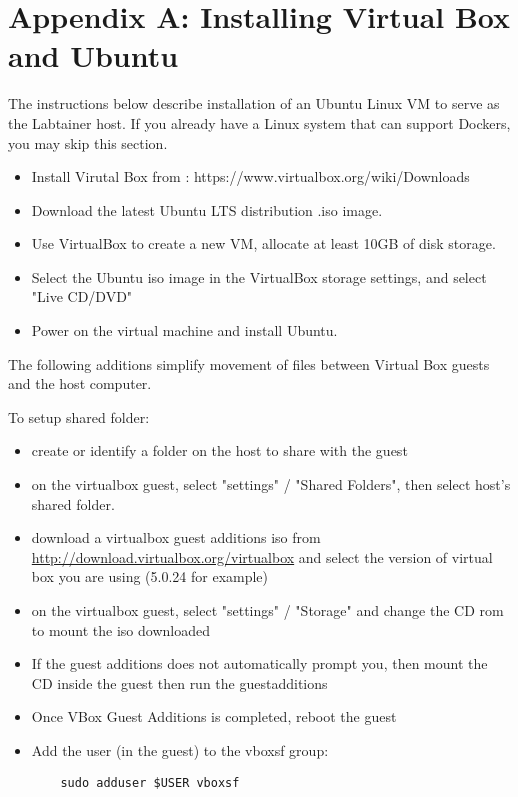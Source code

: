 \documentclass{article}
\begin{document}
\section {Appendix A: Installing Virtual Box and Ubuntu}
\label{sec:appendixA}
The instructions below describe installation of an Ubuntu Linux VM 
to serve as the Labtainer host.  If you already have a Linux system
that can support Dockers, you may skip this section.
\begin{itemize}
\item Install Virutal Box from : https://www.virtualbox.org/wiki/Downloads
\item Download the latest Ubuntu LTS distribution .iso image.
\item Use VirtualBox to create a new VM, allocate at least 10GB of disk storage.
\item Select the Ubuntu iso image in the VirtualBox storage settings, and select "Live CD/DVD"
\item Power on the virtual machine and install Ubuntu.
\end{itemize}

The following additions simplify movement of files between Virtual Box guests
and the host computer.

To setup shared folder:
\begin{itemize}
\item create or identify a folder on the host to share with the guest
\item on the virtualbox guest, select "settings" / "Shared Folders",
then select host's shared folder.

\item download a virtualbox guest additions iso from 
\url{http://download.virtualbox.org/virtualbox} and select
the version of virtual box you are using (5.0.24 for example)

\item on the virtualbox guest, select "settings" / "Storage" and
change the CD rom to mount the iso downloaded

\item If the guest additions does not automatically prompt you, then mount the CD 
inside the guest then run the guestadditions

\item Once VBox Guest Additions is completed, reboot the guest

\item Add the user (in the guest) to the vboxsf group:
\begin{verbatim}
    sudo adduser $USER vboxsf
\end{verbatim}
\end{itemize}
\end{document}
